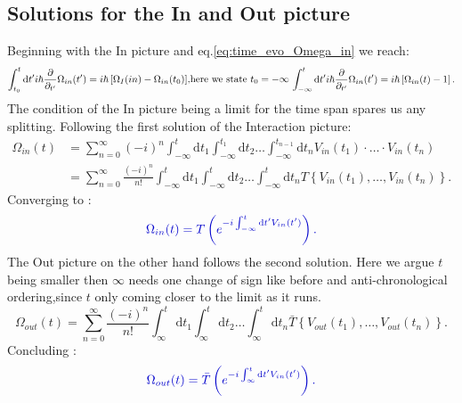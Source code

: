 \documentclass[12pt, titlepage]{article}
\begin{document}
\subsection{Solutions for the In and Out picture}
Beginning with the In picture and eq.\eqref{eq:time_evo_Omega_in} we reach:
\begin{subequations}
\begin{align}
\int_{t_{0}}^{t}\mathrm{d}t'
 i\hbar 
 \frac{\partial}{\partial_{t'}} 
 \Omega_{in} (t')
 =
 i\hbar
 \left[ 
\Omega_{I}(in) -\Omega_{in}(t_{0})
 \right] 
\end{align}
\text{,here we state $ t_{0} = -\infty $ }
\begin{align}
\int_{-\infty}^{t}\mathrm{d}t'
 i\hbar 
 \frac{\partial}{\partial_{t'}} 
 \Omega_{in} (t')
 =
 i\hbar
 \left[ 
\Omega_{in}(t) -1
 \right] 
 .
\end{align}
\end{subequations}
The condition of the In picture being a limit for the time span spares us any splitting. Following the first solution of the Interaction picture: 
\begin{subequations}
\begin{align}
\Omega_{in}(t) &=
\sum\limits_{n=0}^{\infty} 
(-i)^{n}
\int_{-\infty}^{t}\mathrm{d}t_1\int_{-\infty}^{t_{1}}\! \! \mathrm{d}t_2
 \ldots
 \int_{-\infty}^{t_{n-1}}\! \! \mathrm{d}t_n
  V_{in}(t_1)\cdot \ldots \cdot V_{in}(t_n)
&\\
&=
\sum\limits_{n=0}^{\infty} 
\frac{(-i)^{n}}{n!}
\int_{-\infty}^{t}\mathrm{d}t_1\int_{-\infty}^{t}\! \! \mathrm{d}t_2
 \ldots
 \int_{-\infty}^{t}\! \! \mathrm{d}t_n
 T\left\lbrace V_{in}(t_1), \ldots , V_{in}(t_n)\right\rbrace .
\end{align}
\end{subequations}
Converging to :
\begin{equation}\label{eq:Omega_in_converg}
\textcolor[RGB]{0,0,204}{
\Omega_{in}(t)
= T\left( e^{-i\int_{-\infty}^{t}\mathrm{d}t^{\prime} V_{in}(t^{\prime})} \right)
	.}
\end{equation}
The Out picture on the other hand follows the second solution. Here we argue $ t $ being smaller then $ \infty $ needs one change of sign like before and anti-chronological ordering,since $ t $ only coming closer to the limit as it runs.
\begin{equation}
\Omega_{out}(t) =
\sum\limits_{n=0}^{\infty} 
\frac{(-i)^{n}}{n!}
\int_{\infty}^{t}\mathrm{d}t_1\int_{\infty}^{t}\! \! \mathrm{d}t_2
 \ldots
 \int_{\infty}^{t}\! \! \mathrm{d}t_n
 \bar{T}\left\lbrace V_{out}(t_1), \ldots , V_{out}(t_n)\right\rbrace .
\end{equation}
Concluding :
\begin{equation}\label{eq:Omega_out_converg}
\textcolor[RGB]{0,0,204}{
\Omega_{out}(t)
= \bar{T}\left( e^{-i\int_{\infty}^{t}\mathrm{d}t^{\prime} V_{in}(t^{\prime})} \right)
	.}
\end{equation}
\end{document}
